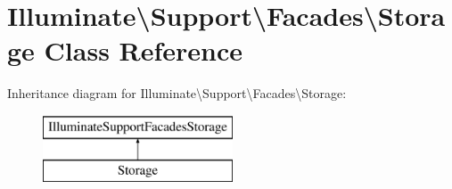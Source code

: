 \hypertarget{class_illuminate_1_1_support_1_1_facades_1_1_storage}{}\section{Illuminate\textbackslash{}Support\textbackslash{}Facades\textbackslash{}Storage Class Reference}
\label{class_illuminate_1_1_support_1_1_facades_1_1_storage}
Inheritance diagram for Illuminate\textbackslash{}Support\textbackslash{}Facades\textbackslash{}Storage\+:\begin{figure}[H]
\begin{center}
\leavevmode
\includegraphics[height=2.000000cm]{class_illuminate_1_1_support_1_1_facades_1_1_storage}
\end{center}
\end{figure}
